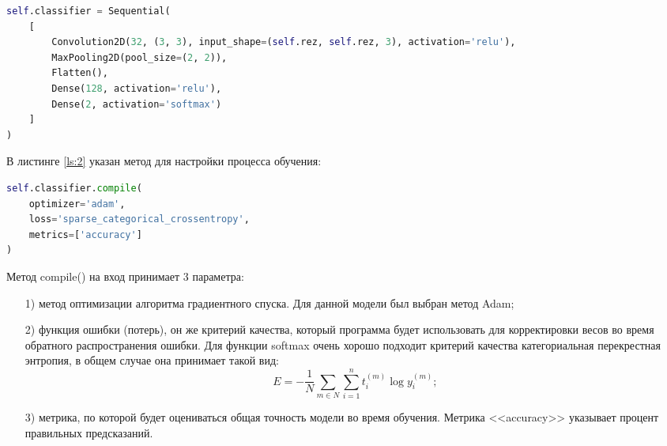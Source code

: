 \begin{lstlisting}[caption={Описание модели нейросети},language=python, label={ls:1}]
self.classifier = Sequential(
    [
        Convolution2D(32, (3, 3), input_shape=(self.rez, self.rez, 3), activation='relu'),
        MaxPooling2D(pool_size=(2, 2)),
        Flatten(),
        Dense(128, activation='relu'),
        Dense(2, activation='softmax')
    ]
)
\end{lstlisting}

В листинге \ref{ls:2} указан метод для настройки процесса обучения:

\begin{lstlisting}[caption={Использовние метода compile()},language=python,label={ls:2}]
self.classifier.compile(
    optimizer='adam', 
    loss='sparse_categorical_crossentropy',
    metrics=['accuracy']
)
\end{lstlisting}
Метод compile() на вход принимает 3 параметра:
\begin{enumerate} 
  \item[1)] метод оптимизации алгоритма градиентного спуска. Для данной модели был выбран метод Adam;
  \item[2)] функция ошибки (потерь), он же критерий качества, который программа будет использовать для корректировки весов во время обратного распространения ошибки. Для функции softmax очень хорошо подходит критерий качества категориальная перекрестная энтропия, в общем случае она принимает такой вид:
\begin{equation}
E = - \frac{1}{N}\sum_{m\in N}\sum_{i=1}^{n}t^{(m)}_{i}\log y^{(m)}_{i};
\end{equation}
  \item[3)] метрика, по которой будет оцениваться общая точность модели во время обучения. Метрика <<accuracy>> указывает процент правильных предсказаний.
\end{enumerate}

